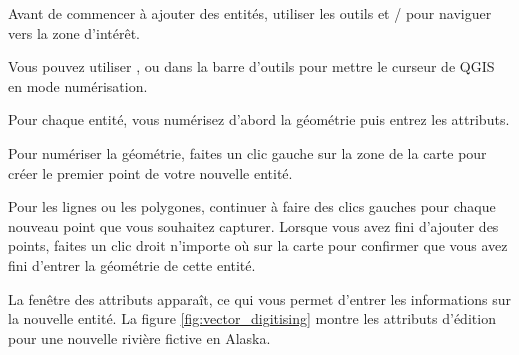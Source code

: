 \begin{itemize}

Avant de commencer à ajouter des entités, utiliser les outils  et / pour naviguer vers la zone d'intérêt.

Vous pouvez utiliser ,  ou  dans la barre d'outils pour mettre le curseur de QGIS en mode numérisation.

Pour chaque entité, vous numérisez d'abord la géométrie puis entrez les attributs.

Pour numériser la géométrie, faites un clic gauche sur la zone de la carte pour créer le premier point de votre nouvelle entité.

Pour les lignes ou les polygones, continuer à faire des clics gauches pour chaque nouveau point que vous souhaitez capturer. Lorsque vous avez fini d'ajouter des points, faites un clic droit n'importe où sur la carte pour confirmer que vous avez fini d'entrer la géométrie de cette entité.

La fenêtre des attributs apparaît, ce qui vous permet d'entrer les informations sur la nouvelle entité. La figure \ref{fig:vector_digitising} montre les attributs d'édition pour une nouvelle rivière fictive en Alaska.


\end{itemize}
